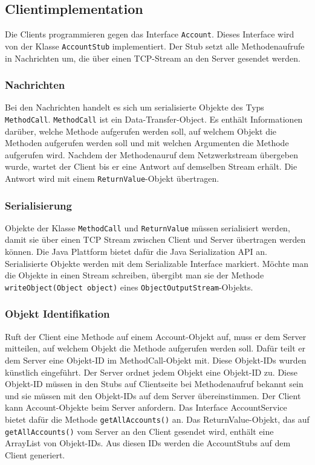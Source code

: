 \subsection{Clientimplementation}
\label{sec:clientimplementation}

Die Clients programmieren gegen das Interface \texttt{Account}. Dieses Interface wird
von der Klasse \texttt{AccountStub} implementiert. Der Stub setzt alle
Methodenaufrufe in Nachrichten um, die über einen TCP-Stream an den
Server gesendet werden. 

\subsubsection{Nachrichten}
\label{sec:nachrichten}


Bei den Nachrichten handelt es sich um
serialisierte Objekte des Typs \texttt{Method\-Call}. \texttt{MethodCall} ist ein Data-Transfer-Object. Es enthält
Informationen darüber, welche Methode aufgerufen werden soll, auf
welchem Objekt die Methoden aufgerufen werden soll und mit welchen
Argumenten die Methode aufgerufen wird. Nachdem der Methodenauruf dem
Netzwerkstream übergeben wurde, wartet der Client bis er eine Antwort
auf demselben Stream erhält. Die Antwort wird mit einem
\texttt{ReturnValue}-Objekt übertragen.

\subsubsection{Serialisierung}
\label{sec:serialisierung}

Objekte der Klasse \texttt{MethodCall} und \texttt{ReturnValue} müssen
serialisiert werden,
da\-mit sie über einen TCP Stream zwischen Client und Server übertragen
werden können. Die Java Plattform bietet dafür die Java Serialization
API\cite{greanier00} an. Serialisierte Objekte werden mit dem Serializable Interface
markiert. Möchte man die Objekte in einen Stream schreiben, übergibt
man sie der Methode
\verb|writeObject(Object object)| eines
\texttt{ObjectOutputStream}-Objekts.

\subsubsection{Objekt Identifikation}
\label{sec:objekt-ident}

Ruft der Client eine Methode auf einem Account-Objekt auf, muss er dem
Server mitteilen, auf welchem Objekt die Methode aufgerufen werden
soll. Dafür teilt er dem Server eine Objekt-ID im MethodCall-Objekt
mit. Diese Objekt-IDs wurden künstlich eingeführt. Der Server ordnet
jedem Objekt eine Objekt-ID zu. Diese Objekt-ID müssen in den Stubs auf Clientseite bei
Methodenaufruf bekannt sein und sie müssen mit den Objekt-IDs auf dem
Server übereinstimmen. Der Client kann Account-Objekte beim Server
anfordern. Das Interface AccountService bietet dafür die Methode
\verb|getAllAccounts()| an. Das ReturnValue-Objekt, das auf
\newline \texttt{get\-All\-Accounts()} vom Server an den Client gesendet wird, enthält eine ArrayList von
Objekt-IDs. Aus diesen IDs werden die AccountStubs auf dem Client generiert.

